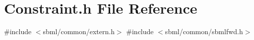 \hypertarget{dependencies_2libsbml-5_815_80-vs2017-release-64_2include_2sbml_2_constraint_8h}{}\section{Constraint.\+h File Reference}
\label{dependencies_2libsbml-5_815_80-vs2017-release-64_2include_2sbml_2_constraint_8h}
{\ttfamily \#include $<$sbml/common/extern.\+h$>$}\newline
{\ttfamily \#include $<$sbml/common/sbmlfwd.\+h$>$}\newline
